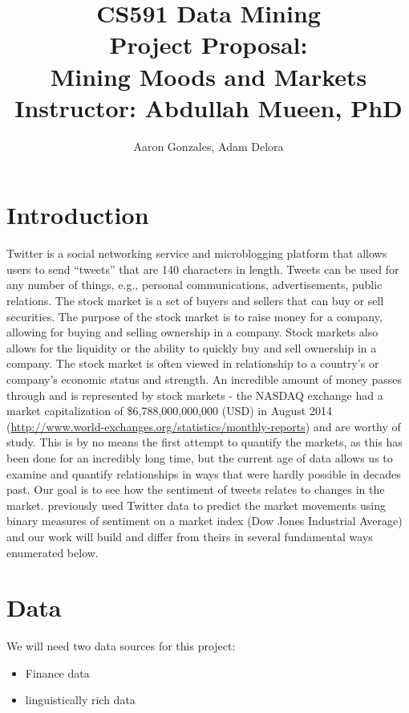 \documentclass[titlepage]{article}\usepackage[]{graphicx}\usepackage[]{color}
\begin{document}
\title{CS591 Data Mining \\ Project Proposal: \\ Mining Moods and Markets \\
Instructor: Abdullah Mueen, PhD}
\author{Aaron Gonzales, Adam Delora}
\maketitle



\section{Introduction}

Twitter is a social networking service and microblogging platform that allows
users to send ``tweets'' that are 140 characters in length. Tweets can be used
for any number of things, e.g., personal communications, advertisements, public relations.
The stock market is a set of buyers and sellers that can buy or sell securities.
The purpose of the stock market is to raise money for a company, allowing for
buying and selling ownership in a company. Stock markets also allows for the
liquidity or the ability to quickly buy and sell ownership in a company. The
stock market is often viewed in relationship to a country's or company's
economic status and strength. An incredible amount of money passes through and
is represented by stock markets - the NASDAQ exchange had a market
capitalization of \$6,788,000,000,000 (USD) in August 2014 
(\url{http://www.world-exchanges.org/statistics/monthly-reports}) and are
worthy of study. This is by no means the first attempt to quantify the markets,
as this has been done for an incredibly long time, but the current age of data
allows us to examine and quantify relationships in ways that were hardly
possible in decades past. Our goal is to see how the sentiment of tweets
relates to changes in the market. \cite{twitterStockMarketPrediction}
previously used Twitter data to predict the market movements using binary
measures of sentiment on a market index (Dow Jones Industrial Average) and our work
will build and differ from theirs in several fundamental ways enumerated below. 

\section{Data}

We will need two data sources for this project: 
\begin{itemize}
	\item Finance data
	\item linguistically rich data
\end{itemize}
\end{document}
